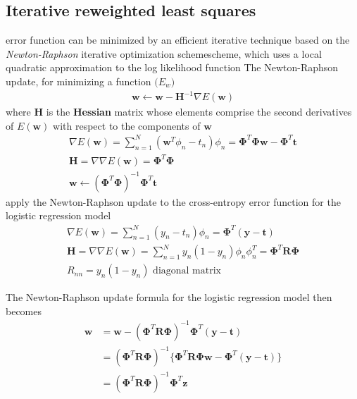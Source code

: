 \documentclass[a4paper]{article}
\begin{document}
\subsection{Iterative reweighted least squares}
error function can be minimized by an efficient iterative technique based on the
 \textit{Newton-Raphson} iterative optimization schemescheme, which uses a
 local quadratic approximation to the log likelihood function
The Newton-Raphson update, for minimizing a function $\mathit(E_w)$
\begin{align}
\mathbf{w} \gets \mathbf{w} - \mathbf{H}^{-1} \nabla \mathit{E}(\mathbf{w})
\end{align}
where $\mathbf{H}$ is the \textbf{Hessian} matrix whose elements comprise the second derivatives of $\mathit{E}(\mathbf{w})$ with respect to the components of $\mathbf{w}$
\begin{align}
\nabla \mathit{E}(\mathbf{w}) = \displaystyle \sum_{n=1}^N
  (\mathbf{w}^T \phi_n - t_n ) \phi_n = \mathbf{\Phi}^T \mathbf{\Phi}
  \mathbf{w} - \mathbf{\Phi}^T \mathbf{t}
\\
\mathbf{H} = \nabla \nabla E(\mathbf{w}) = \mathbf{\Phi}^T \mathbf{\Phi}
\\
\mathbf{w} \gets (\mathbf{\Phi}^T \mathbf{\Phi})^{-1}\mathbf{\Phi}^T \mathbf{t}
\end{align}
apply the Newton-Raphson update to the cross-entropy error function
 for the logistic regression model
\begin{align}
\nabla \mathit{E}(\mathbf{w}) = \displaystyle \sum_{n=1}^N
  (y_n - t_n ) \phi_n = \mathbf{\Phi}^T (\mathbf{y} - \mathbf{t})
\\
\mathbf{H} = \nabla \nabla E(\mathbf{w}) = \displaystyle
  \sum_{n=1}^N y_n(1-y_n)\phi_n\phi_n^T = \mathbf{\Phi}^T
  \mathbf{R} \mathbf{\Phi}
\\
R_{nn} = y_n(1-y_n) \text{ diagonal matrix }
\end{align}

The Newton-Raphson update formula for the logistic regression model then becomes
\begin{align*}
\mathbf{w} &= \mathbf{w} - (\mathbf{\Phi}^T \mathbf{R}
             \mathbf{\Phi})^{-1}\mathbf{\Phi}^T (\mathbf{y} -
             \mathbf{t})
\\
&= (\mathbf{\Phi}^T \mathbf{R} \mathbf{\Phi})^{-1} \{\mathbf{\Phi}^T
  \mathbf{R} \mathbf{\Phi} \mathbf{w} -
  \mathbf{\Phi}^T (\mathbf{y} - \mathbf{t}) \}
\\
&=(\mathbf{\Phi}^T \mathbf{R} \mathbf{\Phi})^{-1} \mathbf{\Phi}^T \mathbf{z}
\end{align*}
\end{document}
